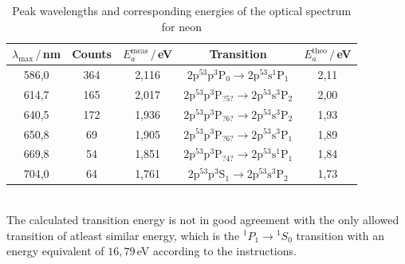 \documentclass[a4paper,12pt]{article}
\newcommand{\tecxt}{}
\begin{document}
\begin{table}[h!]
\centering
\begin{tabular}{c|c|c|c|c}
$\lambda_\tecxt\text{max}\,/\,$nm &Counts&$E_a^{\tecxt\text{meas}}\,/\,$eV&Transition&$E_a^\tecxt\text{theo}\,/\,$eV\\ \hline
586,0&364&2,116&$\mathrm{2p^53p{}^3P_0\rightarrow 2p^53s{}^1P_1}$&2,11  \\ \hline
614,7&165&2,017&$\mathrm{2p^53p{}^3P_{?5?}\rightarrow 2p^53s{}^3P_2}$&2,00  \\ \hline
640,5&172&1,936&$\mathrm{2p^53p{}^3P_{?6?}\rightarrow 2p^53s{}^3P_2}$&1,93  \\ \hline
650,8& 69&1,905&$\mathrm{2p^53p{}^3P_{?6?}\rightarrow 2p^53s{}^3P_1}$&1,89  \\ \hline
669,8& 54&1,851&$\mathrm{2p^53p{}^3P_{?4?}\rightarrow 2p^53s{}^1P_1}$&1,84  \\ \hline
704,0& 64&1,761&$\mathrm{2p^53p{}^3S_1\rightarrow 2p^53s{}^3P_2}$&1,73
\end{tabular}
\caption{Peak wavelengths and corresponding energies of the optical spectrum for neon}
\label{Peak wavelengths of the optical spectrum for neon}
\end{table}\\
The calculated transition energy is not in good agreement with the only allowed transition of atleast similar energy, which is the ${}^1P_1\rightarrow {}^1S_0$ transition with an energy equivalent of $16,79\,$eV according to the instructions.  
\end{document}
